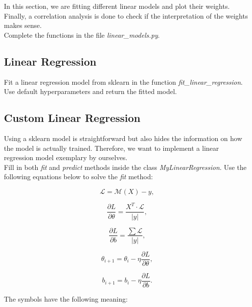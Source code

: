 \documentclass[a4paper]{article}
\begin{document}
\noindent In this section, we are fitting different linear models and plot their weights. Finally, a correlation analysis is done to check if the interpretation of the weights makes sense.\\

\noindent Complete the functions in the file \textit{linear\_models.py}.

\subsection{Linear Regression}
Fit a linear regression model from sklearn in the function \textit{fit\_linear\_regression}. Use default hyperparameters and return the fitted model.


\subsection{Custom Linear Regression}
Using a sklearn model is straightforward but also hides the information on how the model is actually trained. Therefore, we want to implement a linear regression model exemplary by ourselves.\\

\noindent Fill in both \textit{fit} and \textit{predict} methods inside the class \textit{MyLinearRegression}. Use the following equations below to solve the \textit{fit} method:

\begin{equation}
    \mathcal{L} = \mathcal{M}(X) - y,
\end{equation}

\begin{equation}
    \dfrac{\partial L}{\partial \theta} = \dfrac{X^T \cdot \mathcal{L}}{|y|},
\end{equation}

\begin{equation}
    \dfrac{\partial L}{\partial b}  = \dfrac{\sum{\mathcal{L}}}{|y|},
\end{equation}

\begin{equation}
    \theta_{i+1} = \theta_{i} - \eta \dfrac{\partial L}{\partial \theta},
\end{equation}

\begin{equation}
    b_{i+1} = b_{i} - \eta \dfrac{\partial L}{\partial b}.
\end{equation}

\noindent The symbols have the following meaning:
\end{document}
